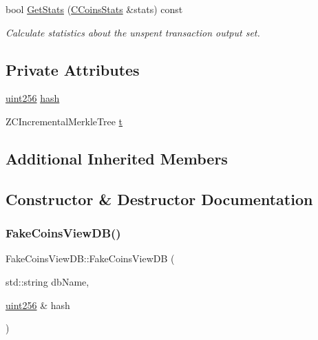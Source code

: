 \begin{DoxyCompactItemize}
\item 
bool \mbox{\hyperlink{class_fake_coins_view_d_b_ad1deefbe955925e274e5d50d289275e9}{Get\+Stats}} (\mbox{\hyperlink{struct_c_coins_stats}{C\+Coins\+Stats}} \&stats) const
\begin{DoxyCompactList}\small\item\em Calculate statistics about the unspent transaction output set. \end{DoxyCompactList}\end{DoxyCompactItemize}
\subsection*{Private Attributes}
\begin{DoxyCompactItemize}
\item 
\mbox{\hyperlink{classuint256}{uint256}} \mbox{\hyperlink{class_fake_coins_view_d_b_a982f684b55a8f103df3f43b7128f6938}{hash}}
\item 
Z\+C\+Incremental\+Merkle\+Tree \mbox{\hyperlink{class_fake_coins_view_d_b_a8478155455bb20042e4459c4179ae921}{t}}
\end{DoxyCompactItemize}
\subsection*{Additional Inherited Members}


\subsection{Constructor \& Destructor Documentation}
\mbox{\label{class_fake_coins_view_d_b_a88aa1d7a9c9136a3ef5f884e76989635}} 
\subsubsection{\texorpdfstring{Fake\+Coins\+View\+D\+B()}{FakeCoinsViewDB()}}
{\footnotesize\ttfamily Fake\+Coins\+View\+D\+B\+::\+Fake\+Coins\+View\+DB (\begin{DoxyParamCaption}\item[{std\+::string}]{db\+Name,  }\item[{\mbox{\hyperlink{classuint256}{uint256}} \&}]{hash }\end{DoxyParamCaption})\hspace{0.3cm}{\ttfamily [inline]}}



